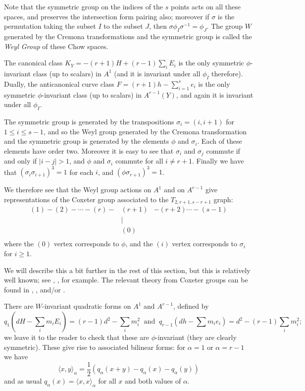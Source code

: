 \documentclass[12pt]{article}
\numberwithin{equation}{section}
\numberwithin{subeq}{equation}
\begin{document}
Note that the symmetric group on the indices of the $s$ points
acts on all these spaces, and preserves the intersection form pairing also;
moreover if $\sigma$ is the permutation taking the subset $I$ to the subset $J$,
then $\sigma \phi_I \sigma^{-1} = \phi_J$.
The group $W$ generated by the Cremona transformations and the symmetric group
is called the \emph{Weyl Group} of these Chow spaces.

The canonical class $K_Y = -(r+1)H + (r-1)\sum_i E_i$ is the only symmetric $\phi$-invariant class
(up to scalars) in $A^1$ (and it is invariant under all $\phi_I$ therefore).
Dually, the anticanonical curve class $F =(r+1)h - \sum_{i=1}^s e_i $
is the only symmetric $\phi$-invariant class (up to scalars) in $A^{r-1}(Y)$,
and again it is invariant under all $\phi_I$.


The symmetric group is generated by the transpositions $\sigma_i = (i,i+1)$
for $1\leq i \leq s-1$,
and so the Weyl group generated by the Cremona transformation and the symmetric group
is generated by the elements $\phi$ and $\sigma_i$.
Each of these elements have order two.
Moreover it is easy to see that $\sigma_i$ and $\sigma_j$ commute
if and only if $|i-j|>1$,
and $\phi$ and $\sigma_i$ commute for all $i \neq r+1$.
Finally we have that $(\sigma_i\sigma_{i+1})^3 = 1$ for each $i$,
and $(\phi\sigma_{r+1})^3 = 1$.

We therefore see that the Weyl group actions on $A^1$ and on $A^{r-1}$
give representations of the Coxeter group associated to the $T_{2,r+1,s-r+1}$ graph:
\begin{equation}\label{Tpqrgraph}
\begin{matrix}
(1)  -  (2)  -  \cdots  -  (r)  - &  (r+1) & -  (r+2)  \cdots  -  (s-1) \\
     &     |           &    \\
     &     (0)       &     \\
\end{matrix}
\end{equation}
where the $(0)$ vertex corresponds to $\phi$,
and the $(i)$ vertex corresponds to $\sigma_i$ for $i \geq 1$.

We will describe this a bit further in the rest of this section,
but this is relatively well known; see
\cite{dolgachev83}, \cite{dolgort88}, \cite{dolgachev08} for example.
The relevant theory from Coxeter groups can be found in
\cite{Bo}, \cite{Hu}, and/or \cite{BB}.

There are $W$-invariant quadratic forms on $A^1$ and $A^{r-1}$,
defined by
\begin{equation}
q_1(dH-\sum_i m_iE_i) = (r-1)d^2-\sum_i m_i^2\;\;\text{and}\;\;
q_{r-1}(dh-\sum m_ie_i) = d^2 - (r-1)\sum_i m_i^2;
\end{equation}
we leave it to the reader to check that these are $\phi$-invariant
(they are clearly symmetric).
These give rise to associated bilinear forms: for $\alpha = 1$ or $\alpha = r-1$ we have
\begin{equation}\label{bil}
\langle x, y \rangle_\alpha = \frac{1}{2}(q_\alpha(x+y)-q_\alpha(x)-q_\alpha(y))
\end{equation}
and as usual $q_\alpha(x) = \langle x, x \rangle_\alpha$ for all $x$ and both values of $\alpha$.
\end{document}
